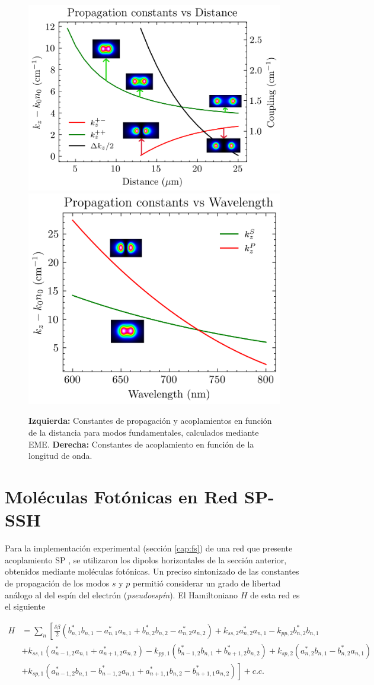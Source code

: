 \begin{figure}[H]
	\centering
	\includegraphics[width=0.50\linewidth]{codigo/dimol2/eigenvalues_vs_angle_1.png}
	\includegraphics[width=0.45\linewidth]{codigo/dimol3/eigenvalues_vs_wavelength.png}
	\caption[Propagaci\'on y acoplamientos en mol\'eculas fot\'onicas]{
		\textbf{Izquierda:} Constantes de propagación y acoplamientos en función de la distancia para modos fundamentales, calculados mediante EME. 
		\textbf{Derecha:} Constantes de acoplamiento en función de la longitud de onda.
		\label{fig:molecule-coup}}
\end{figure}

\section{Moléculas Fotónicas en Red SP-SSH}

Para la implementación experimental (sección \ref{cap:fs}) de una red que presente acoplamiento SP \citep{interorbital, SPSSH}, se utilizaron los dipolos horizontales de la sección anterior, obtenidos mediante moléculas fotónicas. Un preciso sintonizado de las constantes de propagación de los modos $s$ y $p$ permitió considerar un grado de libertad análogo al del espín del electrón (\textit{pseudoespín}). El Hamiltoniano $H$ de esta red \citep{SPSSH,toporusos}  es el siguiente

\begin{align*}
	H &= \sum_n \left[\frac{\delta\beta}{2} \left( b^*_{n, 1} b_{n, 1} - a^*_{n, 1} a_{n, 1} + b^*_{n, 2} b_{n, 2} - a^*_{n, 2} a_{n, 2} \right) +k_{ss, 2}a^*_{n, 2} a_{n, 1} -k_{pp, 2}b^*_{n, 2} b_{n, 1} \right. 
	\\	
	&+ k_{ss, 1} \left( a_{n-1, 2}^*a_{n, 1} + a_{n+1, 2}^*a_{n, 2} \right) - k_{pp, 1} \left( b_{n-1, 2}^*b_{n, 1} + b_{n+1, 2}^*b_{n, 2} \right) + k_{sp, 2} \left( a_{n, 2}^* b_{n, 1} - b_{n, 2}^* a_{n, 1} \right)
	\\
	&+ \left. k_{sp, 1} \left( a_{n-1, 2}^* b_{n, 1} - b_{n-1, 2}^* a_{n, 1} + a_{n+1, 1}^*b_{n, 2} - b_{n+1, 1}^* a_{n, 2} \right) \right] + c.c.
\end{align*}

